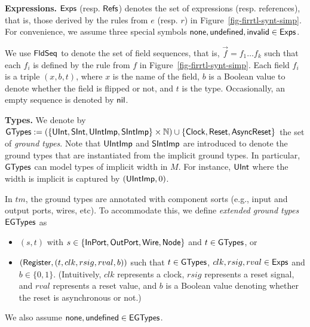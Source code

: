 
\noindent\textbf{Expressions.}
${\sf Exps}$ (resp. ${\sf Refs}$) denotes the set of {\hifirrtl} expressions (resp. references), that is, %
those derived  by the rules from $e$ (resp. $r$) in Figure~\ref{fig-firrtl-synt-simp}.
For convenience, we assume three special symbols ${\sf none},{\sf undefined}, {\sf invalid} \in {\sf Exps}$.

We use ${\sf FldSeq}$ to denote the set of field sequences, that is, $\vec{f} = f_1 \ldots f_k$ such that each $f_i$ is defined by the rule from $f$ in Figure~\ref{fig-firrtl-synt-simp}.
Each field $f_i$ is a triple $(x, b, t)$, where $x$ is the name of the field, $b$ is a Boolean value to denote whether the field is flipped or not, and $t$ is the type. Occasionally, an empty sequence is denoted by ${\sf nil}$.

\noindent\textbf{Types.}
We denote by ${\sf GTypes}:= (\{{\sf UInt}, {\sf SInt}, {\sf UIntImp}, {\sf SIntImp}\} \times \mathbb{N}) \cup \{{\sf Clock},
{\sf Reset}, {\sf AsyncReset}\}$ the set of \emph{ground types}.
Note that ${\sf UIntImp}$ and ${\sf SIntImp}$ are introduced to denote the %
ground types that are instantiated from the implicit ground types. %
%
In particular, ${\sf GTypes}$ can model types of implicit width in $M$. For instance, ${\sf UInt}$ where the width is implicit is captured by $({\sf UIntImp}, 0)$.
%
%

In $tm$,  the ground types are annotated with component sorts (e.g., input and output ports, wires, etc). To accommodate this, we define \emph{extended ground types} ${\sf EGTypes}$ as %
\begin{itemize}
\item $(s, t)$ with $s \in \{\sf InPort, \sf OutPort, {\sf Wire}, {\sf Node}\}$ and $t \in {\sf GTypes}$, or
\item $({\sf Register}, (t, clk, rsig, rval, b))$ such that $t \in {\sf GTypes}$, $clk, rsig, rval \in {\sf Exps}$ and $b\in \{0,1\}$. (Intuitively, $clk$ represents a clock, $rsig$ represents a reset signal, and $rval$ represents a reset value, and $b$ is a Boolean value denoting whether the reset is asynchronous or not.)
\end{itemize}
We also assume ${\sf none},{\sf undefined} \in {\sf EGTypes}$.

